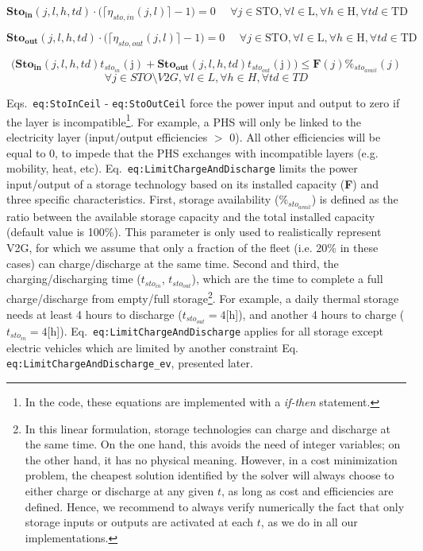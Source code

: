 \documentclass[
]{article}
\begin{document}
{\[\textbf{Sto}_\textbf{in}(j,l,h,td)\cdot \Big(\lceil  \eta_{sto,in}(j,l)\rceil -1 \Big) = 0  ~~~~~~ \forall j \in \text{STO},\forall l \in \text{L}, \forall h \in \text{H}, \forall td \in \text{TD}\]}

{\[\textbf{Sto}_\textbf{out}(j,l,h,td)\cdot \Big(\lceil  \eta_{sto,out}(j,l)\rceil -1 \Big) = 0  ~~~~~~ \forall j \in \text{STO},\forall l \in \text{L}, \forall h \in \text{H}, \forall td \in \text{TD}\]}

{\[\Big(\textbf{Sto}_\textbf{in} (j,l,h,td)t_{sto_{in}}(\text{j}) + \textbf{Sto}_\textbf{out}(j,l,h,td)t_{sto_{out}}(\text{j})\Big) \leq \textbf{F} (j)\%_{sto_{avail}}(j)\]\[\forall j \in STO \setminus {V2G} , \forall l \in L, \forall h \in H, \forall td \in TD\]}

Eqs.~\texttt{eq:StoInCeil} - \texttt{eq:StoOutCeil} force the power
input and output to zero if the layer is incompatible\footnote{In the
  code, these equations are implemented with a \emph{if-then} statement.}.
For example, a PHS will only be linked to the electricity layer
(input/output efficiencies \(>\) 0). All other efficiencies will be
equal to 0, to impede that the PHS exchanges with incompatible layers
(e.g. mobility, heat, etc). Eq.~\texttt{eq:LimitChargeAndDischarge}
limits the power input/output of a storage technology based on its
installed capacity (\textbf{F}) and three specific characteristics.
First, storage availability (\(\%_{sto_{avail}}\)) is defined as the
ratio between the available storage capacity and the total installed
capacity (default value is 100\%). This parameter is only used to
realistically represent V2G, for which we assume that only a fraction of
the fleet (i.e. 20\% in these cases) can charge/discharge at the same
time. Second and third, the charging/discharging time (\(t_{sto_{in}}\),
\(t_{sto_{out}}\)), which are the time to complete a full
charge/discharge from empty/full storage\footnote{In this linear
  formulation, storage technologies can charge and discharge at the same
  time. On the one hand, this avoids the need of integer variables; on
  the other hand, it has no physical meaning. However, in a cost
  minimization problem, the cheapest solution identified by the solver
  will always choose to either charge or discharge at any given \(t\),
  as long as cost and efficiencies are defined. Hence, we recommend to
  always verify numerically the fact that only storage inputs or outputs
  are activated at each \(t\), as we do in all our implementations.}.
For example, a daily thermal storage needs at least 4 hours to discharge
(\(t_{sto_{out}}=4\){[}h{]}), and another 4 hours to charge
(\(t_{sto_{in}}=4\){[}h{]}). Eq.~\texttt{eq:LimitChargeAndDischarge}
applies for all storage except electric vehicles which are limited by
another constraint Eq. \texttt{eq:LimitChargeAndDischarge\_ev},
presented later.
\end{document}
